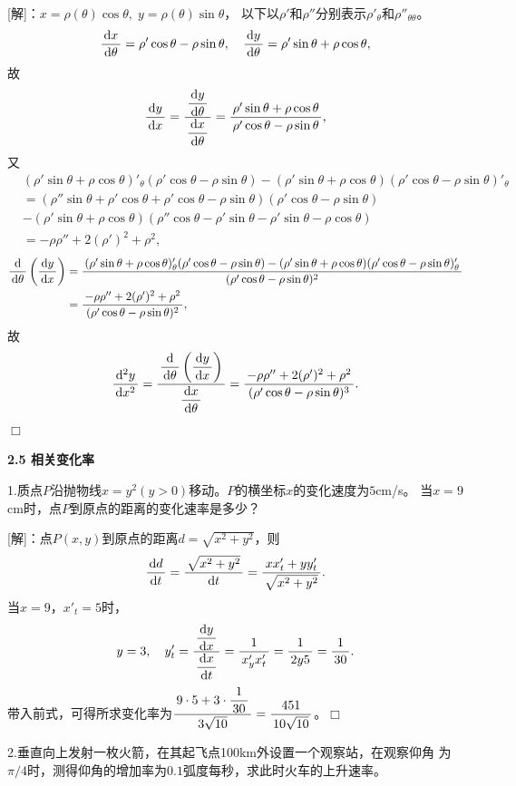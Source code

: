 [解]：$x=\rho(\theta)\cos\theta,\;y=\rho(\theta)\sin\theta$，
以下以$\rho'$和$\rho''$分别表示$\rho'_{\theta}$和$\rho''_{\theta\theta}$。
$$\df{\d x}{\d\theta}=\rho'\cos\theta-\rho\sin\theta,
\quad
\df{\d y}{\d\theta}=\rho'\sin\theta+\rho\cos\theta,$$
故
$$\df{\d y}{\d x}=\df{\df{\d y}{\d\theta}}{\df{\d x}{\d\theta}}
=\df{\rho'\sin\theta+\rho\cos\theta}{\rho'\cos\theta-\rho\sin\theta},$$
又
\begin{align*}
	&(\rho'\sin\theta+\rho\cos\theta)'_{\theta}(\rho'\cos\theta-\rho\sin\theta)
	-(\rho'\sin\theta+\rho\cos\theta)(\rho'\cos\theta-\rho\sin\theta)'_{\theta}\\
	&=(\rho''\sin\theta+\rho'\cos\theta+\rho'\cos\theta-\rho\sin\theta)
	(\rho'\cos\theta-\rho\sin\theta)\\
	&-(\rho'\sin\theta+\rho\cos\theta)
	(\rho''\cos\theta-\rho'\sin\theta-\rho'\sin\theta-\rho\cos\theta)\\
	&=-\rho\rho''+2(\rho')^2+\rho^2,
\end{align*}
\begin{align*}
	\df{\d}{\d\theta}\left(\df{\d y}{\d x}\right)
	&=\df{(\rho'\sin\theta+\rho\cos\theta)'_{\theta}(\rho'\cos\theta-\rho\sin\theta)
	-(\rho'\sin\theta+\rho\cos\theta)(\rho'\cos\theta-\rho\sin\theta)'_{\theta}}
	{(\rho'\cos\theta-\rho\sin\theta)^2}\\
	&=\df{-\rho\rho''+2(\rho')^2+\rho^2}{(\rho'\cos\theta-\rho\sin\theta)^2},
\end{align*}
故
$$
\df{\d^2y}{\d x^2}
=\df{\df{\d}{\d\theta}\left(\df{\d y}{\d x}\right)}{\df{\d x}{\d\theta}}
=\df{-\rho\rho''+2(\rho')^2+\rho^2}{(\rho'\cos\theta-\rho\sin\theta)^3}.
$$
\hfill$\Box$

\begin{center}
	\bf 2.5 相关变化率
\end{center}

\bigskip

1.质点$P$沿抛物线$x=y^2(y>0)$移动。$P$的横坐标$x$的变化速度为$5$cm/s。
当$x=9$cm时，点$P$到原点的距离的变化速率是多少？

[解]：点$P(x,y)$到原点的距离$d=\sqrt{x^2+y^2}$，则
$$\df{\d d}{\d t}=\df{\sqrt{x^2+y^2}}{\d t}
=\df{xx'_t+yy'_t}{\sqrt{x^2+y^2}}.$$
当$x=9$，$x'_t=5$时，
$$
	y=3,\quad
	y'_t=\df{\df{\d y}{\d x}}{\df{\d x}{\d t}}
	=\df1{x'_yx'_t}=\df1{2y5}=\df1{30}.
$$
带入前式，可得所求变化率为$\df{9\cdot 5+3\cdot\df1{30}}{3\sqrt{10}}
=\df{451}{10\sqrt{10}}$。\hfill$\Box$

\bigskip

2.垂直向上发射一枚火箭，在其起飞点100km外设置一个观察站，在观察仰角
为$\pi/4$时，测得仰角的增加率为$0.1$弧度每秒，求此时火车的上升速率。

